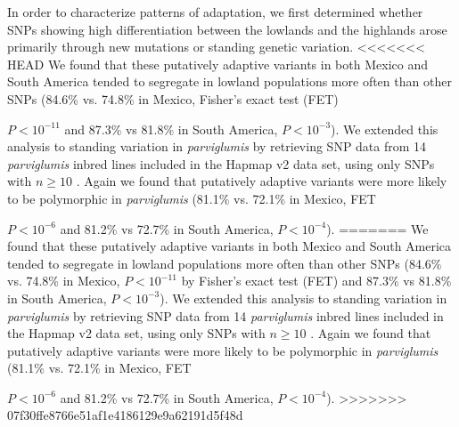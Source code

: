 In order to characterize patterns of adaptation, we first determined whether  SNPs showing high differentiation between the lowlands and the highlands arose primarily through new mutations or standing genetic variation.  
<<<<<<< HEAD
We found that these putatively adaptive variants in both Mexico and South America tended to segregate in lowland populations more often than other SNPs (84.6\% vs. 74.8\% in Mexico, Fisher's exact test (FET) {$P < 10^{-11}$ and 87.3\% vs 81.8\% in South America,  $P< 10^{-3}$).  We extended this analysis to standing variation in \emph{parviglumis} by retrieving SNP data from 14 \emph{parviglumis} inbred lines included in the Hapmap v2 data set, using only SNPs with $n\geq10$ \cite[]{Hufford_2012_22660546}.  Again we found that putatively adaptive variants were more likely to be polymorphic in \emph{parviglumis} (81.1\% vs. 72.1\% in Mexico, FET {$P < 10^{-6}$ and 81.2\% vs 72.7\% in South America,  $P< 10^{-4}$).  
=======
We found that these putatively adaptive variants in both Mexico and South America tended to segregate in lowland populations more often than other SNPs (84.6\% vs. 74.8\% in Mexico, $P < 10^{-11}$ by Fisher's exact test (FET) and 87.3\% vs 81.8\% in South America,  $P< 10^{-3}$).  
We extended this analysis to standing variation in \textit{parviglumis} by retrieving SNP data from 14 \textit{parviglumis} inbred lines included in the Hapmap v2 data set, using only SNPs with $n\geq10$ \citep{Hufford_2012_22660546}.  Again we found that putatively adaptive variants were more likely to be polymorphic in \textit{parviglumis} (81.1\% vs. 72.1\% in Mexico, FET {$P < 10^{-6}$ and 81.2\% vs 72.7\% in South America,  $P< 10^{-4}$).  
>>>>>>> 07f30ffe8766e51af1e4186129e9a62191d5f48d


}}}
